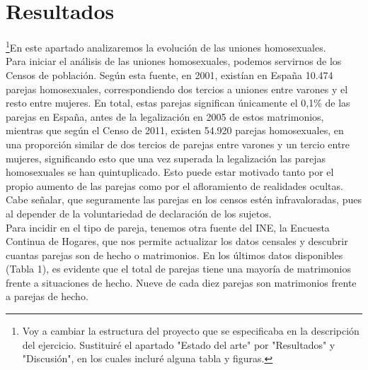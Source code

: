 \documentclass{article}
\begin{document}
\section{Resultados}
\footnote{Voy a cambiar la estructura del proyecto que se especificaba en la descripción del ejercicio. Sustituiré el apartado "Estado del arte" por "Resultados" y "Discusión", en los cuales incluré alguna tabla y figuras.}En este apartado analizaremos la evolución de las uniones homosexuales.\\
Para iniciar el análisis de las uniones homosexuales, podemos servirnos de los Censos de población. Según esta fuente, en 2001, existían en España 10.474 parejas homosexuales, correspondiendo dos tercios a uniones entre varones y el resto entre mujeres. En total, estas parejas significan únicamente el 0,1\% de las parejas en España, antes de la legalización en 2005 de estos matrimonios, mientras que según el Censo de 2011, existen 54.920 parejas homosexuales, en una proporción similar de dos tercios de
parejas entre varones y un tercio entre mujeres, significando esto que una vez superada la legalización las parejas homosexuales se han quintuplicado. Esto puede estar
motivado tanto por el propio aumento de las parejas como por el afloramiento de realidades ocultas. Cabe señalar, que seguramente las parejas en los censos estén infravaloradas, pues al depender de la voluntariedad de declaración de los sujetos.
\\

Para incidir en el tipo de pareja, tenemos otra fuente del INE, la Encuesta Continua de Hogares, que nos permite actualizar los datos censales y descubrir cuantas parejas son de hecho o matrimonios. En los últimos datos disponibles (Tabla 1), es evidente que el total de parejas tiene una mayoría de matrimonios frente a situaciones de hecho. Nueve de cada diez parejas son matrimonios frente a parejas de hecho.
\\
\end{document}
